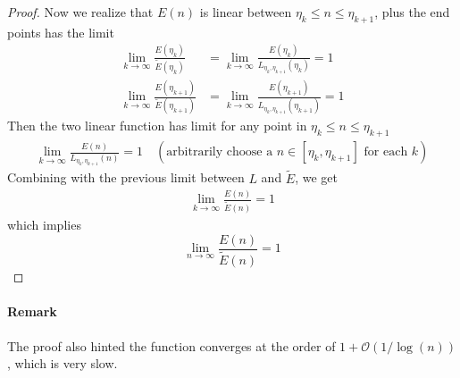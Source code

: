 \documentclass[]{article}
\begin{document}
\begin{proof}
	Now we realize that $E(n)$ is linear between $\eta_k\le n \le \eta_{k+1}$, plus the end points has the limit
	\begin{align*}
	\lim_{k\to\infty} \frac{E(\eta_k)}{\tilde{E}(\eta_k)} &= \lim_{k\to\infty} \frac{E(\eta_k)}{L_{\eta_{k},\eta_{k+1}}(\eta_k)} = 1 \\
	\lim_{k\to\infty} \frac{E(\eta_{k+1})}{\tilde{E}(\eta_{k+1})} &= \lim_{k\to\infty} \frac{E(\eta_{k+1})}{L_{\eta_{k},\eta_{k+1}}(\eta_{k+1})} = 1
	\end{align*}
	Then the two linear function has limit for any point in $\eta_k\le n \le\eta_{k+1}$
	\begin{align*}
	\lim_{k\to\infty} \frac{E(n)}{L_{\eta_{k},\eta_{k+1}}(n)} = 1 \quad(\text{arbitrarily choose a $n\in[\eta_k,\eta_{k+1}]$ for each $k$})
	\end{align*}
	Combining with the previous limit between $L$ and $\tilde{E}$, we get
	\begin{align*}
	\lim_{k\to\infty} \frac{E(n)}{\tilde{E}(n)} = 1
	\end{align*}
	which implies 
	\[
	\lim_{n\to\infty} \frac{E(n)}{\tilde{E}(n)} = 1
	\]
	
	
\end{proof}

\paragraph{Remark}

The proof also hinted the function converges at the order of $1+\mathcal{O}(1/\log(n))$, which is very slow. 
\end{document}
